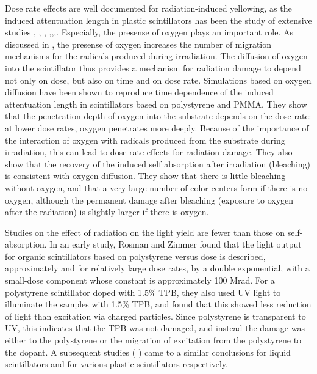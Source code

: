 \documentclass[review]{elsarticle}
\begin{document}
Dose rate effects are well documented for radiation-induced yellowing, as
the induced attentuation length in plastic scintillators has been the study of extensive studies \cite{34504}, \cite{Wick1991472}, \cite{289295},
\cite{173180},\cite{467829},\cite{Wulkop1995141},\cite{173178}.  Especially, the presense of oxygen plays an important role.  As discussed 
in \cite{Wulkop1995141}, the presense of oxygen
increases the number of migration mechanisms for the radicals produced during irradiation.  The diffusion of oxygen into the scintillator thus
provides a mechanism for radiation damage to depend not only on dose, but also on time and on dose rate.  Simulations based on oxygen diffusion have been shown
to reproduce time dependence of the induced attentuation length in scintillators based on polystyrene and PMMA\cite{Wick1991472}.  
They show that the penetration depth of oxygen into the substrate
depends on the dose rate: at lower dose rates, oxygen penetrates
more deeply.  Because of the importance of the interaction
of oxygen with radicals produced from the substrate during irradiation, this can lead to dose rate effects
for radiation damage.  They also show that the recovery of the
induced self absorption after irradiation (bleaching) is consistent with
oxygen diffusion.  They show that there is little bleaching
without oxygen, and that a very large number of color centers
form if there is no oxygen, although the permanent damage after
bleaching (exposure to oxygen after the radiation) is slightly
larger if there is oxygen.

Studies on the effect of radiation on the light yield are fewer
than those on self-absorption.
In an early study, Rosman and Zimmer\cite{rosmanzimmer} found that the light
output for organic scintillators based on polystyrene versus dose is described,
approximately and for relatively large dose rates, by a double exponential, 
with a small-dose component whose constant is approximately 100 Mrad.
For a polystyrene scintillator doped with 1.5\% TPB, they also used UV light to illuminate
the samples with 1.5\% TPB, and found that this showed less
reduction of light than excitation via charged particles.
Since polystyrene is transparent to UV, this
indicates that the TPB was not damaged, and instead the damage
was either to the polystyrene or the migration of excitation from the polystyrene
to the dopant.  A subsequent studies (\cite{berlman} \cite{173178}) came to a similar conclusions for
liquid scintillators and for various plastic scintillators respectively. 
\end{document}
